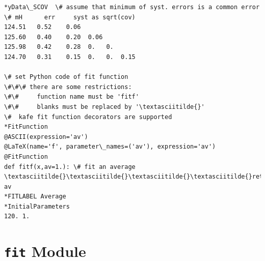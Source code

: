 \documentclass[a4paper,10pt,english]{sphinxmanual}
\begin{document}
\begin{fulllineitems}
\begin{Verbatim}[commandchars=\\\{\}]
*yData\_SCOV  \# assume that minimum of syst. errors is a common error
\# mH      err     syst as sqrt(cov)
124.51   0.52    0.06
125.60   0.40    0.20  0.06
125.98   0.42    0.28  0.   0.
124.70   0.31    0.15  0.   0.  0.15

\# set Python code of fit function
\#\#\# there are some restrictions:
\#\#     function name must be 'fitf'
\#\#     blanks must be replaced by '\textasciitilde{}'
\#  kafe fit function decorators are supported
*FitFunction
@ASCII(expression='av')
@LaTeX(name='f', parameter\_names=('av'), expression='av')
@FitFunction
def fitf(x,av=1.): \# fit an average
\textasciitilde{}\textasciitilde{}\textasciitilde{}\textasciitilde{}return av
*FITLABEL Average
*InitialParameters
120. 1.
\end{Verbatim}

\end{fulllineitems}



\section{\texttt{fit} Module}
\label{index:fit-module}\label{index:module-kafe.fit}\label{index:module-fit}
\end{document}
